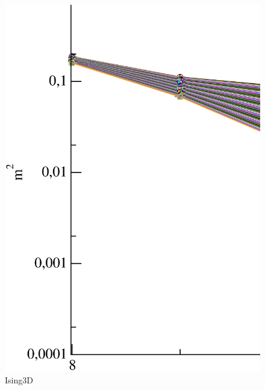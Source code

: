 \begin{figure}[!htpb]
  \centering
  \includegraphics[width=15cm]{./plots/Ising3D/Ising3D_M2_vs_L.eps}
  \caption{Ising3D}
\end{figure}


